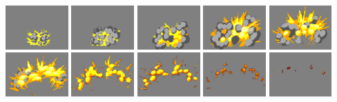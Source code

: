 \documentclass[10pt]{book}
\begin{document}
\begin{CJK}{UTF8}{gkai}
\begin{center}
\includegraphics[width=0.18\textwidth]{previews/nightstrike_0-EXPLODE_BIG-00.png}
\includegraphics[width=0.18\textwidth]{previews/nightstrike_0-EXPLODE_BIG-01.png}
\includegraphics[width=0.18\textwidth]{previews/nightstrike_0-EXPLODE_BIG-02.png}
\includegraphics[width=0.18\textwidth]{previews/nightstrike_0-EXPLODE_BIG-03.png}
\includegraphics[width=0.18\textwidth]{previews/nightstrike_0-EXPLODE_BIG-04.png}
\includegraphics[width=0.18\textwidth]{previews/nightstrike_0-EXPLODE_BIG-05.png}
\includegraphics[width=0.18\textwidth]{previews/nightstrike_0-EXPLODE_BIG-06.png}
\includegraphics[width=0.18\textwidth]{previews/nightstrike_0-EXPLODE_BIG-07.png}
\includegraphics[width=0.18\textwidth]{previews/nightstrike_0-EXPLODE_BIG-08.png}
\includegraphics[width=0.18\textwidth]{previews/nightstrike_0-EXPLODE_BIG-09.png}
\end{center}


\end{CJK}
\end{document}
